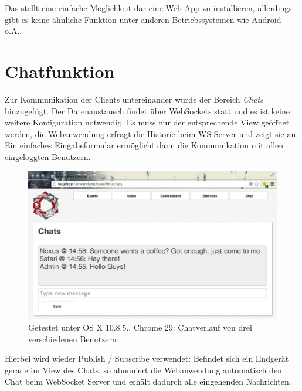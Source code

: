 Das stellt eine einfache Möglichkeit dar eine Web-App zu installieren, allerdings gibt es keine ähnliche Funktion unter anderen Betriebssystemen wie Android o.Ä..


\section{Chatfunktion}
Zur Kommunikation der Clients untereinander wurde der Bereich \emph{Chats} hinzugefügt. Der Datenaustausch findet über WebSockets statt und es ist keine weitere Konfiguration notwendig. Es muss nur der entsprechende View geöffnet werden, die Webanwendung erfragt die Historie beim WS Server und zeigt sie an. Ein einfaches Eingabeformular ermöglicht dann die Kommunikation mit allen eingeloggten Benutzern.

\begin{figure}[!ht]
	\centering
	\includegraphics[width=15cm]{fig/screenshot_chat}
	\caption[Beispielansicht der Chats]{Getestet unter OS X 10.8.5., Chrome 29: Chatverlauf von drei verschiedenen Benutzern}
\end{figure}

Hierbei wird wieder Publish / Subscribe verwendet: Befindet sich ein Endgerät gerade im View des Chats, so abonniert die Webanwendung automatisch den Chat beim WebSocket Server und erhält dadurch alle eingehenden Nachrichten.


